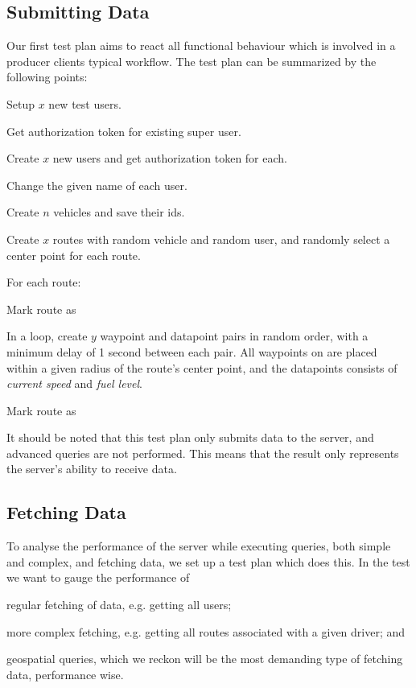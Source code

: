 \subsection{Submitting Data}
Our first test plan aims to react all functional behaviour which is involved in a producer clients typical workflow.
The test plan can be summarized by the following points:
\begin{enumberate}
    \item Setup $x$ new test users.
    \begin{enumberate}
        \item Get authorization token for existing super user.
        \item Create $x$ new users and get authorization token for each.
        \item Change the given name of each user.
    \end{enumberate}
    \item Create $n$ vehicles and save their ids.
    \item Create $x$ routes with random vehicle and random user, and randomly select a center point for each route.
    \item For each route:
    \begin{enumberate}
        \item Mark route as 
        \item In a loop, create $y$ waypoint and datapoint pairs in random order, with a minimum delay of 1 second between each pair.
              All waypoints on are placed within a given radius of the route's center point, and the datapoints consists of \textit{current speed} and \textit{fuel level}.
        \item Mark route as 
    \end{enumberate}
\end{enumberate}

It should be noted that this test plan only submits data to the server, and advanced queries are not performed.
This means that the result only represents the server's ability to receive data.

\subsection{Fetching Data}
To analyse the performance of the server while executing queries, both simple and complex, and fetching data, we set up a test plan which does this.
In the test we want to gauge the performance of
\begin{enumberate*}
    \item regular fetching of data, e.g. getting all users;
    \item more complex fetching, e.g. getting all routes associated with a given driver; and
    \item geospatial queries, which we reckon will be the most demanding type of fetching data, performance wise.
\end{enumberate*}


